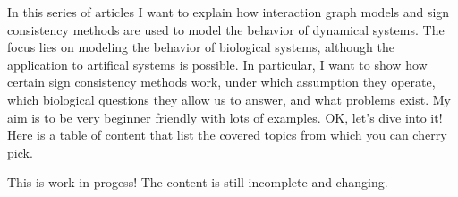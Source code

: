 In this series of articles I want to explain how interaction graph models
and sign consistency methods are used to model the behavior of dynamical systems.
The focus lies on modeling the behavior of biological systems, although the application to artifical systems is possible.
In particular, I want to show how certain sign consistency methods work, 
 under which assumption they operate,
 which biological questions they allow us to answer,
 and what problems exist. 
My aim is to be very beginner friendly with lots of examples. 
OK, let's dive into it!
Here is a table of content that list the covered topics from which you can cherry pick.

\bigskip
This is work in progess! The content is still incomplete and changing.
